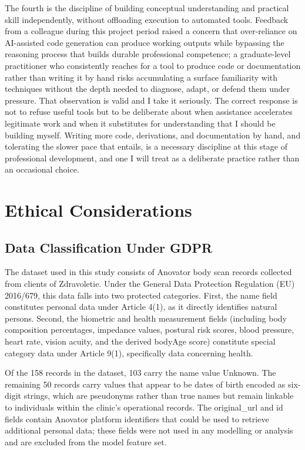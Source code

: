 \documentclass[11pt,a4paper]{report}
\begin{document}
The fourth is the discipline of building conceptual understanding and practical skill independently,
without offloading execution to automated tools. Feedback from a colleague during this project
period raised a concern that over-reliance on AI-assisted code generation can produce working
outputs while bypassing the reasoning process that builds durable professional competence; a
graduate-level practitioner who consistently reaches for a tool to produce code or documentation
rather than writing it by hand risks accumulating a surface familiarity with techniques without the
depth needed to diagnose, adapt, or defend them under pressure. That observation is valid and I
take it seriously. The correct response is not to refuse useful tools but to be deliberate about
when assistance accelerates legitimate work and when it substitutes for understanding that I should
be building myself. Writing more code, derivations, and documentation by hand, and tolerating
the slower pace that entails, is a necessary discipline at this stage of professional
development, and one I will treat as a deliberate practice rather than an occasional choice.

\appendix
\chapter{Ethical Considerations}

\section{Data Classification Under GDPR}

The dataset used in this study consists of Anovator body scan records collected from clients of Zdravoletie. Under the General Data Protection Regulation (EU) 2016/679, this data falls into two protected categories. First, the name field constitutes personal data under Article 4(1), as it directly identifies natural persons. Second, the biometric and health measurement fields (including body composition percentages, impedance values, postural risk scores, blood pressure, heart rate, vision acuity, and the derived bodyAge score) constitute special category data under Article 9(1), specifically data concerning health.

Of the 158 records in the dataset, 103 carry the name value Unknown. The remaining 50 records carry values that appear to be dates of birth encoded as six-digit strings, which are pseudonyms rather than true names but remain linkable to individuals within the clinic's operational records. The original\_url and id fields contain Anovator platform identifiers that could be used to retrieve additional personal data; these fields were not used in any modelling or analysis and are excluded from the model feature set.
\end{document}
